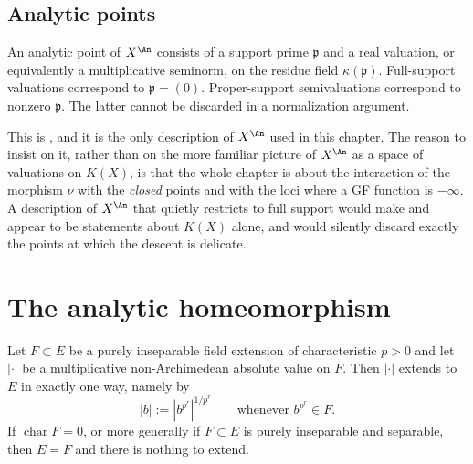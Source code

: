 \subsection{Analytic points}
\label{sec:ch43-analytic-points}

An analytic point of $X^{\An}$ consists of a support prime
$\mathfrak p$ and a real valuation, or equivalently a multiplicative
seminorm, on the residue field $\kappa(\mathfrak p)$.
Full-support valuations correspond to $\mathfrak p=(0)$.
Proper-support semivaluations correspond to nonzero $\mathfrak p$.
The latter cannot be discarded in a normalization argument.

This is , and it is the only description of
$X^{\An}$ used in this chapter.  The reason to insist on it, rather than
on the more familiar picture of $X^{\An}$ as a space of valuations on
$K(X)$, is that the whole chapter is about the interaction of the
morphism $\nu$ with the \emph{closed} points and with the loci where a GF
function is $-\infty$.  A description of $X^{\An}$ that quietly
restricts to full support would make  and
 appear to be statements about
$K(X)$ alone, and would silently discard exactly the points at which the
descent is delicate.

\section{The analytic homeomorphism}
\label{sec:ch43-analytic}

\begin{lemma}
\label{lem:ch43-inseparable-extension}
Let $F\subset E$ be a purely inseparable field extension of characteristic
$p>0$ and let $|\cdot|$ be a multiplicative non-Archimedean absolute
value on $F$.  Then $|\cdot|$ extends to $E$ in exactly one way,
namely by
\[
 |b|:=|b^{p^r}|^{1/p^r}
 \qquad\text{whenever }b^{p^r}\in F.
\]
If $\operatorname{char}F=0$, or more generally if $F\subset E$ is purely
inseparable and separable, then $E=F$ and there is nothing to extend.
\end{lemma}

